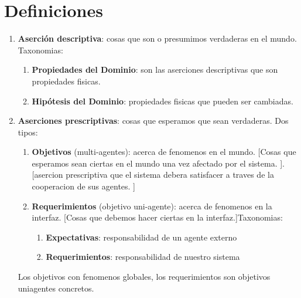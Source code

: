 
\section{Definiciones}
\begin{enumerate}
\item {\bf Aserci\'on descriptiva}: cosas que son o presumimos verdaderas en el mundo. Taxonomias: 
  \begin{enumerate}
    \item {\bf Propiedades del Dominio}: son las aserciones descriptivas que son propiedades fisicas. 
    \item {\bf Hip\'otesis del Dominio}: propiedades fisicas que pueden ser cambiadas. 
  \end{enumerate}
  
\item {\bf Aserciones prescriptivas}: cosas que esperamos que sean verdaderas. Dos tipos: 
  \begin{enumerate}
    \item {\bf Objetivos} (multi-agentes): acerca de fenomenos en el mundo. [Cosas que esperamos sean ciertas en el mundo una vez afectado por el sistema. ]. [asercion prescriptiva que el sistema debera satisfacer a traves de la cooperacion de sus agentes. ]
    \item {\bf Requerimientos} (objetivo uni-agente): acerca de fenomenos en la interfaz. [Cosas que debemos hacer ciertas en la interfaz.]Taxonomias: 
      \begin{enumerate}
	  \item {\bf Expectativas}: responsabilidad de un agente externo
	  \item {\bf Requerimientos}: responsabilidad de nuestro sistema
      \end{enumerate}
  \end{enumerate}
  Los objetivos con fenomenos globales, los requerimientos son objetivos uniagentes concretos.


\end{enumerate}
